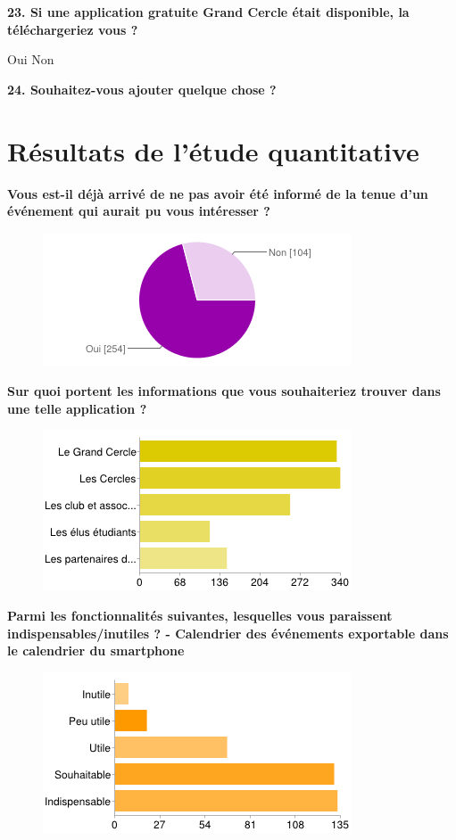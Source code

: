 \documentclass[a4paper, 11px]{article}
\begin{document}
\textbf{23. Si une application gratuite Grand Cercle était disponible, la téléchargeriez vous ? }

    Oui
    Non


\textbf{24. Souhaitez-vous ajouter quelque chose ?}
\newpage

\section{Résultats de l'étude quantitative}
\vfill
\textbf{Vous est-il déjà arrivé de ne pas avoir été informé de la tenue d'un événement qui aurait pu vous intéresser ?}
\begin{figure}[h!]
\includegraphics[scale=1]{tenue_event.png}
\end{figure}
\vspace{2cm}

\textbf{Sur quoi portent les informations que vous souhaiteriez trouver dans une telle application ?}
\begin{figure}[h!]
\includegraphics[scale=1]{asso_info.png}
\end{figure}
\vfill
\clearpage


\vfill
\textbf{Parmi les fonctionnalités suivantes, lesquelles vous paraissent indispensables/inutiles ? - Calendrier des événements exportable dans le calendrier du smartphone}
\begin{figure}[h!]
\includegraphics[scale=1]{calendrier.png}
\end{figure}
\end{document}
